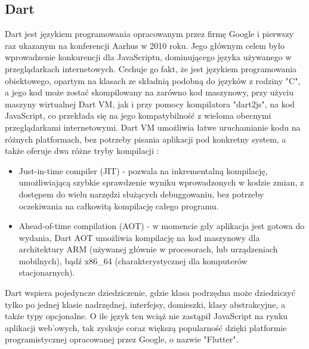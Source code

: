 \documentclass[12pt, a4paper]{article}
\begin{document}
\begin{sloppypar}
{  \subsection{Dart}
  {
    Dart jest językiem programowania opracowanym przez firmę Google i pierwszy raz
    ukazanym na konferencji Aarhus w 2010 roku. Jego głównym celem było wprowadzenie
    konkurencji dla JavaScriptu, dominującego języka używanego w przeglądarkach
    internetowych. Cechuje go fakt, że jest językiem programowania obiektowego, opartym
    na klasach ze składnią podobną do języków z rodziny "C", a jego kod może zostać
    skompilowany na zarówno kod maszynowy, przy użyciu maszyny wirtualnej Dart VM, jak
    i przy pomocy kompilatora "dart2js", na kod JavaScript, co przekłada się na jego
    kompatybilność z wieloma obecnymi przeglądarkami internetowymi. Dart VM umożliwia
    łatwe uruchamianie kodu na różnych platformach, bez potrzeby pisania aplikacji pod
    konkretny system, a także oferuje dwa różne tryby kompilacji \cite{dart}:
    \begin{itemize}
      \item Just-in-time compiler (JIT) - pozwala na inkrementalną kompilację,
      umożliwiającą szybkie sprawdzenie wyniku wprowadzonych w kodzie zmian, z dostępem do
      wielu narzędzi służących debuggowaniu, bez potrzeby oczekiwania na całkowitą
      kompilację całego programu.
      \item Ahead-of-time compilation (AOT) - w momencie gdy aplikacja jest gotowa do
      wydania, Dart AOT umożliwia kompilację na kod maszynowy dla architektury ARM
      (używanej głównie w procesorach, lub urządzeniach mobilnych), bądź x86\_64
      (charakterystycznej dla komputerów stacjonarnych).
    \end{itemize}
    Dart wspiera pojedyncze dziedziczenie, gdzie klasa podrzędna może dziedziczyć tylko
    po jednej klasie nadrzędnej, interfejsy, domieszki, klasy abstrakcyjne, a także typy
    opcjonalne. O ile język ten wciąż nie zastąpił JavaScript na rynku aplikacji web'owych,
    tak zyskuje coraz większą popularność dzięki platformie programistycznej opracowanej
    przez Google, o nazwie "Flutter".
  }
}
\end{sloppypar}
\end{document}
